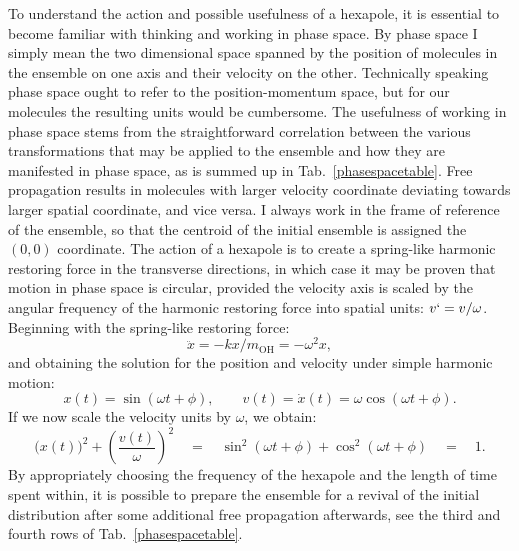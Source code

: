 To understand the action and possible usefulness of a hexapole, it is essential to become familiar with thinking and working in phase space.
By phase space I simply mean the two dimensional space spanned by the position of molecules in the ensemble on one axis and their velocity on the other.
Technically speaking phase space ought to refer to the position-momentum space, but for our molecules the resulting units would be cumbersome.
The usefulness of working in phase space stems from the straightforward correlation between the various transformations that may be applied to the ensemble and how they are manifested in phase space, as is summed up in Tab.~\ref{phasespacetable}.
Free propagation results in molecules with larger velocity coordinate deviating towards larger spatial coordinate, and vice versa.
I always work in the frame of reference of the ensemble, so that the centroid of the initial ensemble is assigned the $(0,0)$ coordinate.
The action of a hexapole is to create a spring-like harmonic restoring force in the transverse directions, in which case it may be proven that motion in phase space is circular, provided the velocity axis is scaled by the angular frequency of the harmonic restoring force into spatial units: $v` = v/\omega$.
Beginning with the spring-like restoring force:
\begin{equation}
\ddot{x} = -kx/m_\text{OH} = -\omega^2x,
\end{equation}
and obtaining the solution for the position and velocity under simple harmonic motion:
\begin{equation}
x(t) = \sin(\omega t + \phi),\qquad v(t) =\dot{x}(t) = \omega\cos(\omega t + \phi).
\end{equation}
If we now scale the velocity units by $\omega$, we obtain:
\begin{equation}
\biggl(x(t)\biggr)^2 + \left(\frac{v(t)}{\omega}\right)^2\quad = \quad\sin^2(\omega t + \phi) + \cos^2(\omega t + \phi)\quad =\quad 1.
\end{equation}
By appropriately choosing the frequency of the hexapole and the length of time spent within, it is possible to prepare the ensemble for a revival of the initial distribution after some additional free propagation afterwards, see the third and fourth rows of Tab.~\ref{phasespacetable}.

